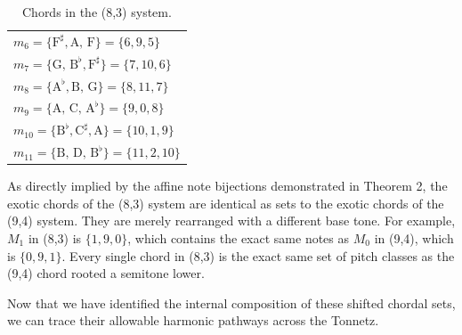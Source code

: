 \documentclass[11pt,letterpaper]{amsart}
\begin{document}
{\begin{table}[H]
\begin{minipage}{0.48\textwidth}
\begin{tabular}{l}
        $m_6 = \{\text{F}^\sharp, \text{A, F}\} = \{6, 9, 5\}$ \\
        $m_7 = \{\text{G, B}^\flat, \text{F}^\sharp\} = \{7, 10, 6\}$ \\
        $m_8 = \{\text{A}^\flat, \text{B, G}\} = \{8, 11, 7\}$ \\
        $m_9 = \{\text{A, C, A}^\flat\} = \{9, 0, 8\}$ \\
        $m_{10} = \{\text{B}^\flat, \text{C}^\sharp, \text{A}\} = \{10, 1, 9\}$ \\
        $m_{11} = \{\text{B, D, B}^\flat\} = \{11, 2, 10\}$ \\
        \bottomrule
        \end{tabular}
    \end{minipage}
    \caption{Chords in the (8,3) system.}
\end{table}}

As directly implied by the affine note bijections demonstrated in Theorem 2, the exotic chords of the (8,3) system are identical as sets to the exotic chords of the (9,4) system. They are merely rearranged with a different base tone. For example, $M_1$ in (8,3) is $\{1, 9, 0\}$, which contains the exact same notes as $M_0$ in (9,4), which is $\{0, 9, 1\}$. Every single chord in (8,3) is the exact same set of pitch classes as the (9,4) chord rooted a semitone lower.

Now that we have identified the internal composition of these shifted chordal sets, we can trace their allowable harmonic pathways across the Tonnetz.
\end{document}
